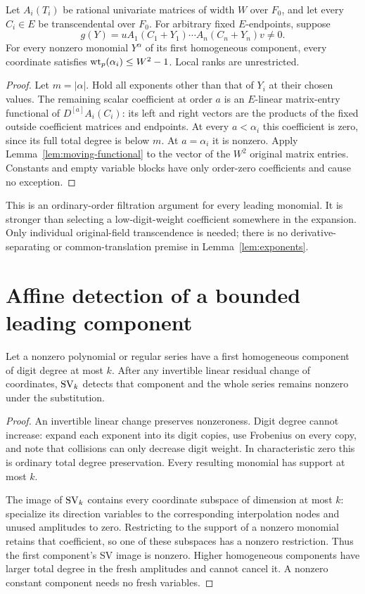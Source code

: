 \begin{lemma}\label{lem:exponents}
Let $A_i(T_i)$ be rational univariate matrices of width $W$ over
$F_0$, and let every $C_i\in E$ be transcendental over $F_0$.
For arbitrary fixed $E$-endpoints, suppose
\[
 g(Y)=uA_1(C_1+Y_1)\cdots A_n(C_n+Y_n)v\ne0.
\]
For every nonzero monomial $Y^\alpha$ of its first homogeneous
component, every coordinate satisfies
$\operatorname{wt}_p(\alpha_i)\le W^2-1$. Local ranks are unrestricted.
\end{lemma}
\begin{proof}
Let $m=|\alpha|$. Hold all exponents other than that of $Y_i$ at
their chosen values. The remaining scalar coefficient at order $a$
is an $E$-linear matrix-entry functional of $D^{[a]}A_i(C_i)$:
its left and right vectors are the products of the fixed outside
coefficient matrices and endpoints. At every $a<\alpha_i$ this
coefficient is zero, since its full total degree is below $m$.
At $a=\alpha_i$ it is nonzero. Apply
Lemma~\ref{lem:moving-functional} to the vector of the $W^2$
original matrix entries. Constants and empty variable blocks have
only order-zero coefficients and cause no exception.
\end{proof}

This is an ordinary-order filtration argument for every leading
monomial. It is stronger than selecting a low-digit-weight coefficient
somewhere in the expansion. Only individual original-field
transcendence is needed; there is no derivative-separating or
common-translation premise in Lemma~\ref{lem:exponents}.

\section{Affine detection of a bounded leading component}

\begin{lemma}\label{lem:affine-detection}
Let a nonzero polynomial or regular series have a first homogeneous
component of digit degree at most $k$. After any invertible linear
residual change of coordinates, $\operatorname{SV}_k$ detects that component and
the whole series remains nonzero under the substitution.
\end{lemma}
\begin{proof}
An invertible linear change preserves nonzeroness. Digit degree cannot
increase: expand each exponent into its digit copies, use Frobenius
on every copy, and note that collisions can only decrease digit weight.
In characteristic zero this is ordinary total degree preservation.
Every resulting monomial has support at most $k$.

The image of $\operatorname{SV}_k$ contains every coordinate subspace of dimension
at most $k$: specialize its direction variables to the corresponding
interpolation nodes and unused amplitudes to zero. Restricting to
the support of a nonzero monomial retains that coefficient, so one of
these subspaces has a nonzero restriction. Thus the first component's
SV image is nonzero. Higher homogeneous components have larger total
degree in the fresh amplitudes and cannot cancel it. A nonzero constant
component needs no fresh variables.
\end{proof}

